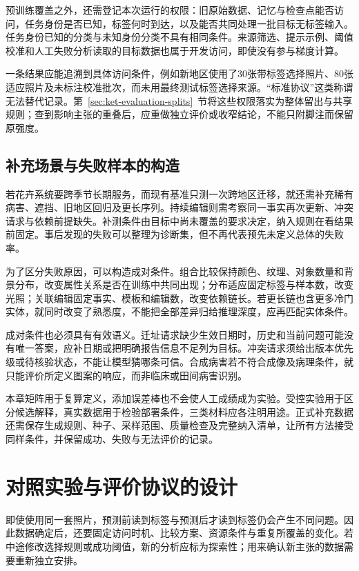 预训练覆盖之外，还需登记本次运行的权限：旧原始数据、记忆与检查点能否访问，任务身份是否已知，标签何时到达，以及能否共同处理一批目标无标签输入。任务身份已知的分类与未知身份分类不具有相同条件。来源筛选、提示示例、阈值校准和人工失败分析读取的目标数据也属于开发访问，即使没有参与梯度计算。

一条结果应能追溯到具体访问条件，例如新地区使用了30张带标签选择照片、80张适应照片及未标注校准批次，而未用最终测试标签选择来源。“标准协议”这类称谓无法替代记录。第~\ref{sec:ket-evaluation-splits}~节将这些权限落实为整体留出与共享规则；查到影响主张的重叠后，应重做独立评价或收窄结论，不能只附脚注而保留原强度。

\subsection{补充场景与失败样本的构造}
\label{sec:ket-evaluation-stress}

若花卉系统要跨季节长期服务，而现有基准只测一次跨地区迁移，就还需补充稀有病害、遮挡、旧地区回归及更长序列。持续编辑则需考察同一事实再次更新、冲突请求与依赖前提缺失。补测条件由目标中尚未覆盖的要求决定，纳入规则在看结果前固定。事后发现的失败可以整理为诊断集，但不再代表预先未定义总体的失败率。

为了区分失败原因，可以构造成对条件。组合比较保持颜色、纹理、对象数量和背景分布，改变属性关系是否在训练中共同出现；分布适应固定标签与样本数，改变光照；关联编辑固定事实、模板和编辑数，改变依赖链长。若更长链也含更多冷门实体，就同时改变了熟悉度，不能把全部差异归给推理深度，应再匹配实体条件。

成对条件也必须具有有效语义。迁址请求缺少生效日期时，历史和当前问题可能没有唯一答案，应补日期或把明确报告信息不足列为目标。冲突请求须给出版本优先级或待核验状态，不能让模型猜哪条可信。合成病害若不符合成像及病理条件，就只能评价所定义图案的响应，而非临床或田间病害识别。

本章矩阵用于复算定义，添加误差棒也不会使人工成绩成为实验。受控实验用于区分候选解释，真实数据用于检验部署条件，三类材料应各注明用途。正式补充数据还需保存生成规则、种子、采样范围、质量检查及完整纳入清单，让所有方法接受同样条件，并保留成功、失败与无法评价的记录。

\section{对照实验与评价协议的设计}
\label{sec:ket-evaluation-protocol}

即使使用同一套照片，预测前读到标签与预测后才读到标签仍会产生不同问题。因此数据确定后，还要固定访问时机、比较方案、资源条件与重复所覆盖的变化。若中途修改选择规则或成功阈值，新的分析应标为探索性；用来确认新主张的数据需要重新独立安排。

